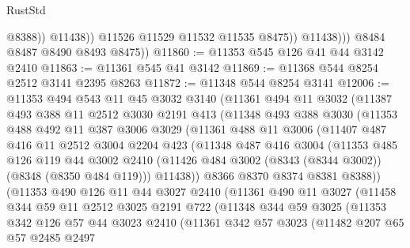 \begin{lexlean}{RustStd}
\begin{coremodule}
{\begin{coremodule}
{{{{{{{{{{{{{{{{{{{{{{{{{{{{{{{{{{{{{{{{{{{{{{{{{{                          @8388))
                      @11438))
                  @11526
                  @11529
                  @11532
                  @11535
                  @8475))
              @11438)))
        @8484
        @8487
        @8490
        @8493
        @8475))
@11860 := @11353 @545 @126 @41 @44 @3142 @2410
@11863 := @11361 @545 @41 @3142
@11869 := @11368 @544 @8254 @2512 @3141 @2395 @8263
@11872 := @11348 @544 @8254 @3141
@12006 := @11353
    @494
    @543
    @11
    @45
    @3032
    @3140
    (@11361
      @494
      @11
      @3032
      (@11387
        @493
        @388
        @11
        @2512
        @3030
        @2191
        @413
        (@11348
          @493
          @388
          @3030
          (@11353
            @488
            @492
            @11
            @387
            @3006
            @3029
            (@11361
              @488
              @11
              @3006
              (@11407
                @487
                @416
                @11
                @2512
                @3004
                @2204
                @423
                (@11348
                  @487
                  @416
                  @3004
                  (@11353
                    @485
                    @126
                    @119
                    @44
                    @3002
                    @2410
                    (@11426 @484 @3002 (@8343 (@8344 @3002)) (@8348 (@8350 @484 @119)))
                    @11438))
                @8366
                @8370
                @8374
                @8381
                @8388))
            (@11353
              @490
              @126
              @11
              @44
              @3027
              @2410
              (@11361
                @490
                @11
                @3027
                (@11458
                  @344
                  @59
                  @11
                  @2512
                  @3025
                  @2191
                  @722
                  (@11348
                    @344
                    @59
                    @3025
                    (@11353
                      @342
                      @126
                      @57
                      @44
                      @3023
                      @2410
                      (@11361
                        @342
                        @57
                        @3023
                        (@11482
                          @207
                          @65
                          @57
                          @2485
                          @2497
}}}}}}}}}}}}}}}}}}}}}}}}}}}}}}}}}}}}}}}}}}}}}}}}}}
\end{coremodule}}
\end{coremodule}
\end{lexlean}
